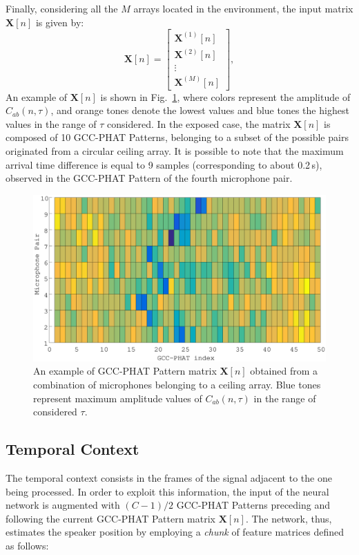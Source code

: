 \documentclass[review]{elsarticle}
\newcommand{\figref}[1]{Fig.~\ref{#1}}
\begin{document}
Finally, considering all the $M$ arrays located in the environment, the input matrix $\mathbf{X}[n]$ is given by:
\begin{equation}
\mathbf{X}[n] =   \begin{bmatrix} \mathbf{X}^{(1)}[n] \\ \mathbf{X}^{(2)}[n] \\ \vdots\\ \mathbf{X}^{(M)}[n] \end{bmatrix},
\end{equation}
An example of $\mathbf{X}[n]$ is shown in \figref{fig:GCC-PATT}, where colors represent the amplitude of $C_{ab}(n,\tau)$, and orange tones denote the lowest values and blue tones the highest values in the range of $\tau$ considered. In the exposed case, the matrix $\mathbf{X}[n]$ is composed of 10 GCC-PHAT Patterns, belonging to a subset of the possible pairs originated from a circular ceiling array. It is possible to note that the maximum arrival time difference is equal to 9 samples (corresponding to about 0.2\,s), observed in the GCC-PHAT Pattern of the fourth microphone pair.


\begin{figure}[h]
	\centering
	\includegraphics[width=0.9\columnwidth]{imgs/GCC-PHAT-PATTERN}
	\caption{An example of GCC-PHAT Pattern matrix $\mathbf{X}[n]$ obtained from a combination of microphones belonging to a ceiling array. Blue tones represent maximum amplitude values of $C_{ab}(n,\tau)$ in the range of considered $\tau$.}
	\label{fig:GCC-PATT}
\end{figure}

\subsection{Temporal Context}\label{sec:TEE}
The temporal context consists in the frames of the signal adjacent to the one being processed. In order to exploit this information, the input of the neural network  is augmented with $(C-1)/2$ GCC-PHAT Patterns preceding and following the current GCC-PHAT Pattern matrix $\mathbf{X}[n]$. The network, thus, estimates the speaker position by employing a \textit{chunk} of feature matrices defined as follows:
\end{document}

